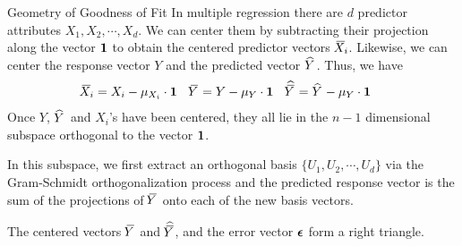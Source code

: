 %    
%
%
\begin{frame}{Geometry of Goodness of Fit}
In multiple regression there are $d$ predictor attributes $X_1, X_2,
\cdots, X_d$. We can center them by subtracting their projection along
the vector $\mathbf{1}$ to obtain the centered predictor vectors $\mkern 1.5mu\overline{\mkern-4.0muX}\mkern 1.5mu_{\!i}$. Likewise,
we can center the response vector $Y$ and the predicted vector $\mkern 1.5mu\widehat{\mkern-1.5muY}\mkern 1.5mu$. Thus, we have 
\begin{align*}
    \mkern 1.5mu\overline{\mkern-4.0muX}\mkern 1.5mu_{\!i} & = X_i - \mu_{X_i} \cdot \mathbf{1} &
    \mkern 1.5mu\overline{\mkern-4.0muY}\mkern 1.5mu & = Y - \mu_Y \cdot \mathbf{1} &
    \widehat{\mkern 1.5mu\overline{\mkern-4.0muY}\mkern 1.5mu} & = \mkern 1.5mu\widehat{\mkern-1.5muY}\mkern 1.5mu - \mu_Y \cdot \mathbf{1}
\end{align*}
%
Once $Y$, $\mkern 1.5mu\widehat{\mkern-1.5muY}\mkern 1.5mu$ and $X_{\!i}$'s have been centered, they all lie in the $n-1$
dimensional subspace orthogonal to the vector $\mathbf{1}$.

\medskip

In this subspace, we first extract an orthogonal basis $\{U_1, U_2,
\cdots, U_d\}$ via the Gram-Schmidt orthogonalization process %
and the predicted response
vector is the sum of the projections of $\mkern 1.5mu\overline{\mkern-4.0muY}\mkern 1.5mu$ onto each of the new basis
vectors.

\medskip

The centered
vectors $\mkern 1.5mu\overline{\mkern-4.0muY}\mkern 1.5mu$ and $\widehat{\mkern 1.5mu\overline{\mkern-4.0muY}\mkern 1.5mu}$, and the error vector ${\bm \epsilon}$ 
form a right triangle.

\end{frame}




